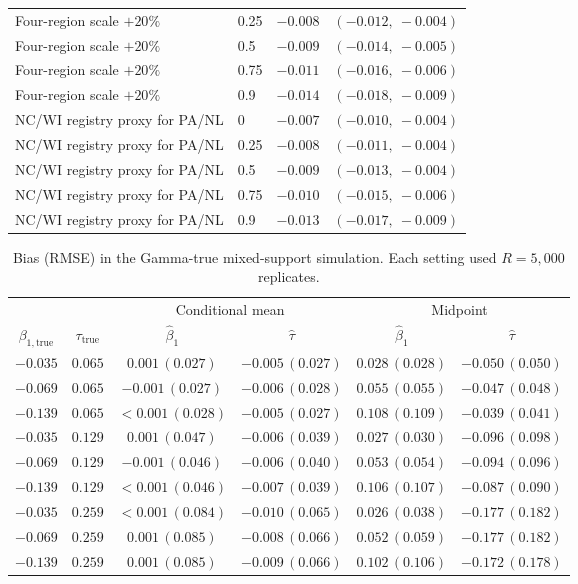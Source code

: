 \documentclass[11pt]{article}
\begin{document}
\begin{landscape}
\begin{table}[p]
\begin{tabular}{llrr}
Four-region scale $+20\%$ & 0.25 & $-0.008$ & $(-0.012,\ -0.004)$ \\
Four-region scale $+20\%$ & 0.5 & $-0.009$ & $(-0.014,\ -0.005)$ \\
Four-region scale $+20\%$ & 0.75 & $-0.011$ & $(-0.016,\ -0.006)$ \\
Four-region scale $+20\%$ & 0.9 & $-0.014$ & $(-0.018,\ -0.009)$ \\
NC/WI registry proxy for PA/NL & 0 & $-0.007$ & $(-0.010,\ -0.004)$ \\
NC/WI registry proxy for PA/NL & 0.25 & $-0.008$ & $(-0.011,\ -0.004)$ \\
NC/WI registry proxy for PA/NL & 0.5 & $-0.009$ & $(-0.013,\ -0.004)$ \\
NC/WI registry proxy for PA/NL & 0.75 & $-0.010$ & $(-0.015,\ -0.006)$ \\
NC/WI registry proxy for PA/NL & 0.9 & $-0.013$ & $(-0.017,\ -0.009)$ \\
\bottomrule
\end{tabular}
\end{table}
\end{landscape}
\pdfpageattr{}

\begin{table}[htbp]
\centering
\caption{Bias (RMSE) in the Gamma-true mixed-support simulation. Each setting used $R=5{,}000$ replicates.}
\begin{tabular}{cc cc cc}
\toprule
& & \multicolumn{2}{c}{Conditional mean} & \multicolumn{2}{c}{Midpoint} \\
\cmidrule(lr){3-4}\cmidrule(lr){5-6}
$\beta_{1,\mathrm{true}}$ & $\tau_{\mathrm{true}}$ & $\hat\beta_1$ & $\hat\tau$ & $\hat\beta_1$ & $\hat\tau$ \\
\midrule
$-0.035$ & $0.065$ & $0.001\,(0.027)$ & $-0.005\,(0.027)$ & $0.028\,(0.028)$ & $-0.050\,(0.050)$ \\
$-0.069$ & $0.065$ & $-0.001\,(0.027)$ & $-0.006\,(0.028)$ & $0.055\,(0.055)$ & $-0.047\,(0.048)$ \\
$-0.139$ & $0.065$ & $<0.001\,(0.028)$ & $-0.005\,(0.027)$ & $0.108\,(0.109)$ & $-0.039\,(0.041)$ \\
$-0.035$ & $0.129$ & $0.001\,(0.047)$ & $-0.006\,(0.039)$ & $0.027\,(0.030)$ & $-0.096\,(0.098)$ \\
$-0.069$ & $0.129$ & $-0.001\,(0.046)$ & $-0.006\,(0.040)$ & $0.053\,(0.054)$ & $-0.094\,(0.096)$ \\
$-0.139$ & $0.129$ & $<0.001\,(0.046)$ & $-0.007\,(0.039)$ & $0.106\,(0.107)$ & $-0.087\,(0.090)$ \\
$-0.035$ & $0.259$ & $<0.001\,(0.084)$ & $-0.010\,(0.065)$ & $0.026\,(0.038)$ & $-0.177\,(0.182)$ \\
$-0.069$ & $0.259$ & $0.001\,(0.085)$ & $-0.008\,(0.066)$ & $0.052\,(0.059)$ & $-0.177\,(0.182)$ \\
$-0.139$ & $0.259$ & $0.001\,(0.085)$ & $-0.009\,(0.066)$ & $0.102\,(0.106)$ & $-0.172\,(0.178)$ \\
\bottomrule
\end{tabular}
\end{table}
\end{document}
